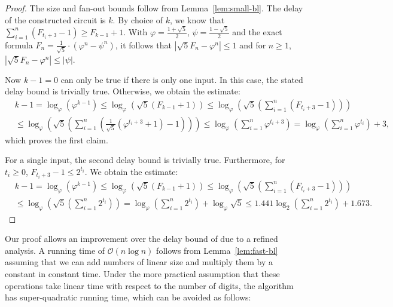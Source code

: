 \documentclass[11pt,final,microtype]{scrartcl}
\theoremstyle{plain}
\theoremstyle{definition}
\theoremstyle{remark}
\newcommand{\ld}{\log_{2}}
\newcommand{\loq}{\log_{\varphi}}
\begin{document}
  \begin{proof}
  The size and fan-out bounds follow from Lemma~\ref{lem:small-bl}.
  The delay of the
  constructed circuit is $k$. By choice of $k$, we know that
  $\sum_{i=1}^n (F_{t_i+3} -1) \geq F_{k-1} + 1$. With $\varphi = \frac{1+
    \sqrt{5}}{2}$, $\psi = \frac{1-\sqrt{5}}{2}$ and the exact formula
  $F_n = \frac{1}{\sqrt{5}} \cdot (\varphi^n - \psi^n)$, it follows that
  $|\sqrt{5}F_n - \varphi^n| \leq 1$ and for $n\geq 1$,
  $|\sqrt{5}F_n - \varphi^n| \leq |\psi|$.

  Now $k -1 = 0$ can only be true if there is only one input. In this
  case, the stated delay bound is trivially true. Otherwise, we obtain
  the estimate:
  \begin{align*}
    &k-1 = \loq \left(\varphi^{k-1}\right) \leq \loq \left(\sqrt{5}
      \left(F_{k-1} + 1\right)\right) \leq \loq \left(\sqrt{5}
      \left(\sum_{i=1}^{n} \left(F_{t_i + 3}  - 1\right)\right)\right) \\
    &\leq \loq \left(\sqrt{5} \left(\sum_{i=1}^{n}
        \left(\frac{1}{\sqrt{5}} \left(\varphi^{t_i + 3} + 1\right) - 1\right)
      \right)\right) \leq \loq \left(\sum_{i=1}^{n} \varphi^{t_i + 3}
    \right) = \loq \left(\sum_{i=1}^{n} \varphi^{t_i} \right) + 3,
  \end{align*}
  which proves the first claim. 

  For a single input, the second delay bound is trivially
  true.  Furthermore, for $t_i \geq 0$, $F_{t_i + 3} - 1\leq
  2^{t_i}$. We obtain the estimate:
  \begin{align*}
    &k-1 = \loq \left(\varphi^{k-1}\right) \leq \loq \left(\sqrt{5}
      \left(F_{k-1} + 1\right)\right) \leq \loq \left(\sqrt{5}
      \left(\sum_{i=1}^{n} \left(F_{t_i + 3}  - 1\right)\right)\right) \\
    &  \leq \loq \left( \sqrt{5} \left (\sum_{i=1}^n 2^{t_i}\right)\right)
    = \loq \left(\sum_{i=1}^n 2^{t_i}\right) + \loq \sqrt{5} 
    \leq 1.441\ld \left(\sum_{i=1}^n 2^{t_i}\right) + 1.673. 
  \end{align*}
\end{proof}

Our proof allows an improvement over the delay bound of \cite{bonn1}
due to a refined analysis.  A running time of $\mathcal{O}(n\log n)$
follows from Lemma~\ref{lem:fast-bl} assuming that we can add numbers
of linear size and multiply them by a constant in constant time.
Under the more practical assumption that these operations take linear
time with respect to the number of digits, the algorithm has
super-quadratic running time, which can be avoided as follows:
\end{document}
